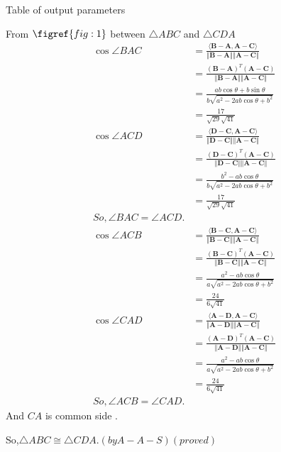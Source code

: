 \documentclass[12pt]{article}
\newcommand\norm[1]{\left\Vert#1\right\Vert}
\providecommand{\brak}[1]{\ensuremath{\left(#1\right)}}
\providecommand{\innpdt}[1]{\ensuremath{\langle#1\rangle}}
\let\vec\mathbf
\begin{document}
\begin{table}[H]
    \centering
    
    \caption{Table of output parameters}
    \label{tab:tab:2}
\end{table}  
From $\figref{fig:1}$ between $\triangle ABC $ and $\triangle CDA$
\begin{align}
\cos{\angle BAC} &= \vec{\frac{\innpdt{B-A,A-C}}{\norm{B-A}\norm{A-C}}}\\
&= \frac{\brak{\vec{B-A}}^T\vec{\brak{A-C}}}{\vec{\norm{B-A}\norm{A-C}}}\\
&=\frac{ab\cos{\theta}+b\sin{\theta}}{b\sqrt{a^2-2ab\cos{\theta}+b^2}}\\
&=\frac{17}{\sqrt{29}\sqrt{41}}\\
\cos{\angle ACD} &= \vec{\frac{\innpdt{D-C,A-C}}{\norm{D-C}\norm{A-C}}}\\
&= \frac{\brak{\vec{D-C}}^T\vec{\brak{A-C}}}{\vec{\norm{D-C}\norm{A-C}}}\\
&= \frac{b^2-ab\cos{\theta}}{b\sqrt{a^2-2ab\cos{\theta}+b^2}}\\
&=\frac{17}{\sqrt{29}\sqrt{41}}\\
So,\angle BAC = \angle ACD.\\
\cos{\angle ACB} &= \vec{\frac{\innpdt{B-C,A-C}}{\norm{B-C}\norm{A-C}}}\\
&= \frac{\brak{\vec{B-C}}^T\vec{\brak{A-C}}}{\vec{\norm{B-C}\norm{A-C}}}\\
&=\frac{a^2-ab\cos{\theta}}{a\sqrt{a^2-2ab\cos{\theta}+b^2}}\\
&=\frac{24}{6\sqrt{41}}\\
\cos{\angle} CAD &= \vec{\frac{\innpdt{A-D,A-C}}{\norm{A-D}\norm{A-C}}}\\
&= \frac{\brak{\vec{A-D}}^T\vec{\brak{A-C}}}{\vec{\norm{A-D}\norm{A-C}}}\\
&=\frac{a^2-ab\cos{\theta}}{a\sqrt{a^2-2ab\cos{\theta}+b^2}}\\
&=\frac{24}{6\sqrt{41}}\\
So,\angle ACB = \angle CAD.
\end{align}
And $CA$ is common side .

So,$\triangle ABC \cong \triangle CDA.\brak{by A-A-S}\brak{proved}$
\end{document}
